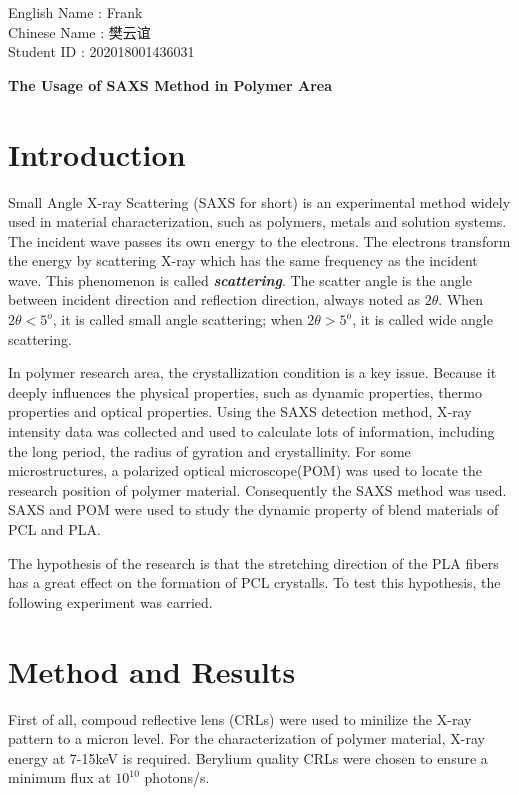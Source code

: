 \documentclass[a4paper,sans]{article}
\begin{document}
\begin{flushleft}
English Name : Frank\\
Chinese Name : 樊云谊\\
Student ID : 202018001436031
\end{flushleft}
\begin{center}
	\textbf{The Usage of SAXS Method in Polymer Area}
\end{center}
	\section{Introduction} %
	\label{intro}
	Small Angle X-ray Scattering (SAXS for short) is an experimental method widely used in material characterization, such as polymers, metals and solution systems. The incident wave passes its own energy to the electrons. The electrons transform the energy by scattering X-ray which has the same frequency as the incident wave. This phenomenon is called \textit{\textbf{scattering}}. \cite{RN102} The scatter angle is the angle between incident direction and reflection direction, always noted as $2\theta$. When $2\theta < 5^{o}$, it is called small angle scattering; when $2\theta > 5^{o}$, it is called wide angle scattering.\cite{RN59}
	

	In polymer research area, the crystallization condition is a key issue. Because it  deeply influences the physical properties, such as dynamic properties, thermo properties and optical properties. \cite{RN40}Using the SAXS detection method, X-ray intensity data was collected and used to calculate lots of information, including the long period, the radius of gyration and crystallinity. For some microstructures, a polarized optical microscope(POM) was used to locate the research position of polymer material. Consequently the SAXS method was used. SAXS and POM were used to study the dynamic property of blend materials of PCL and PLA.\cite{RN35}


	The hypothesis of the research is that the stretching direction of the PLA fibers has a great effect on the formation of PCL crystalls. To test this hypothesis, the following experiment was carried.

\newpage
	\section{Method and Results} %
	\label{sec:method}
	First of all, compoud reflective lens (CRLs) were used to minilize the X-ray pattern to a micron level. For the characterization of polymer material, X-ray energy at 7-15keV is required. Berylium quality CRLs were chosen to ensure a minimum flux at $10^{10}$ photons/s. \cite{RN43}
\end{document}

